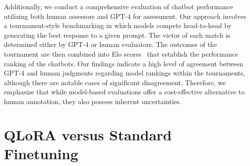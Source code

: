 Additionally, we conduct a comprehensive evaluation of chatbot performance utilizing both human assessors and GPT-4 for assessment. Our approach involves a tournament-style benchmarking in which models compete head-to-head by generating the best response to a given prompt. The victor of each match is determined either by GPT-4 or human evaluators. The outcomes of the tournament are then combined into Elo scores~\citep{elo1967proposed, elo1978rating} that establish the performance ranking of the chatbots. Our findings indicate a high level of agreement between GPT-4 and human judgments regarding model rankings within the tournaments, although there are notable cases of significant disagreement. Therefore, we emphasize that while model-based evaluations offer a cost-effective alternative to human annotation, they also possess inherent uncertainties.

\section{QLoRA versus Standard Finetuning}
\label{sec:comp_to_std}

